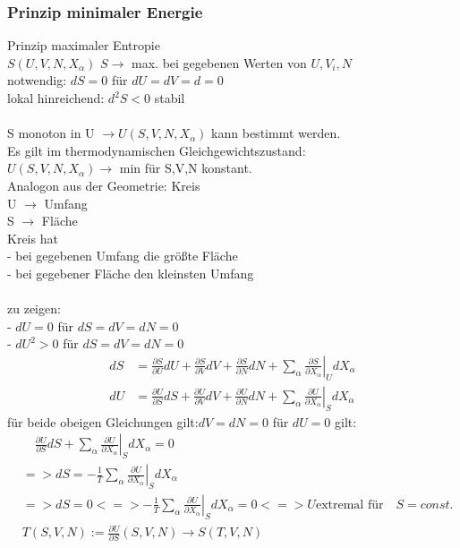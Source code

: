 \documentclass[10pt]{scrartcl}
\begin{document}
\begin{fleqn}
\subsubsection{Prinzip minimaler Energie}
Prinzip maximaler Entropie\\
$S(U,V,N,X_\alpha)$ $S\rightarrow$ max. bei gegebenen Werten von $U,V_i,N$\\
notwendig: $dS=0$ für $dU=dV=d=0$\\
lokal hinreichend: $d^2S<0$ stabil\\ \\
S monoton in U $\rightarrow U(S,V,N,X_\alpha)$ kann bestimmt werden.\\
Es gilt im thermodynamischen Gleichgewichtszustand:\\
$U(S,V,N,X_\alpha) \rightarrow$ min für S,V,N konstant.\\
Analogon aus der Geometrie: Kreis\\
U $\rightarrow$ Umfang\\
S $\rightarrow$ Fläche\\
Kreis hat\\
- bei gegebenen Umfang die größte Fläche\\
- bei gegebener Fläche den kleinsten Umfang\\ \\
zu zeigen:\\
- $dU=0$ für $dS=dV=dN=0$\\
- $dU^2 > 0$ für $dS=dV=dN=0$
\begin{equation}
\begin{aligned}
dS&=\frac{\partial S}{\partial U}dU+\frac{\partial S}{\partial V}dV+\frac{\partial S}{\partial N}dN+\left.\sum_\alpha\frac{\partial S}{\partial X_\alpha}\right|_UdX_\alpha\\
dU&=\frac{\partial U}{\partial S}dS+\frac{\partial U}{\partial V}dV+\frac{\partial U}{\partial N}dN+\left.\sum_\alpha\frac{\partial U}{\partial X_\alpha}\right|_SdX_\alpha
\end{aligned}
\end{equation}
für beide obeigen Gleichungen gilt:$dV=dN=0$
für $dU=0$ gilt: 
\begin{equation}
\begin{aligned}
&\quad \frac{\partial U}{\partial S}dS + \left.\sum_\alpha\frac{\partial U}{\partial X_\alpha}\right|_SdX_\alpha = 0\\
  &=> dS = -\frac{1}{T} \left.\sum_\alpha\frac{\partial U}{\partial X_\alpha}\right|_SdX_\alpha \\
&=> dS = 0 <=> -\frac{1}{T} \left.\sum_\alpha\frac{\partial U}{\partial X_\alpha}\right|_SdX_\alpha = 0 <=> U \text{extremal für} \quad S=const. \\ 
&T(S,V,N) := \frac{\partial U}{\partial S}(S,V,N) \rightarrow S(T,V,N)
\end{aligned}
\end{equation}
\end{fleqn}
\end{document}
